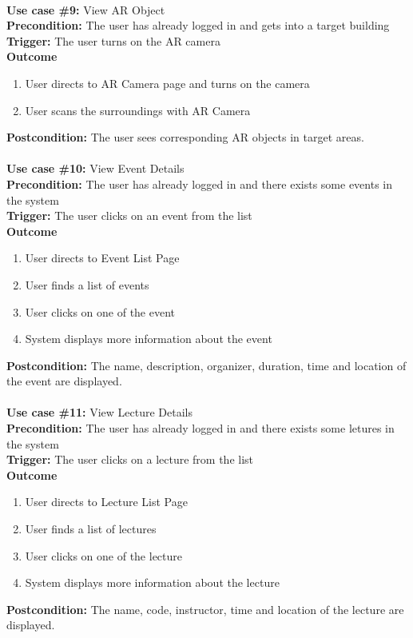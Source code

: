 \documentclass[12pt]{article}
\begin{document}
\noindent\\
\textbf{Use case \#9:} View AR Object\\
\textbf{Precondition:} The user has already logged in and gets into a target building\\
\textbf{Trigger:} The user turns on the AR camera\\
\textbf{Outcome}
\begin{enumerate}
	\item User directs to AR Camera page and turns on the camera
    \item User scans the surroundings with AR Camera
\end{enumerate}
\textbf{Postcondition:} The user sees corresponding AR objects in target areas.\\


\noindent\\
\textbf{Use case \#10:} View Event Details\\
\textbf{Precondition:} The user has already logged in and there exists some events in the system\\
\textbf{Trigger:} The user clicks on an event from the list\\
\textbf{Outcome}
\begin{enumerate}
	\item User directs to Event List Page
    \item User finds a list of events
    \item User clicks on one of the event
    \item System displays more information about the event
\end{enumerate}
\textbf{Postcondition:} The name, description,  organizer, duration, time and location of the event are displayed.\\


\noindent\\
\textbf{Use case \#11:} View Lecture Details\\
\textbf{Precondition:} The user has already logged in and there exists some letures in the system\\
\textbf{Trigger:} The user clicks on a lecture from the list\\
\textbf{Outcome}
\begin{enumerate}
	\item User directs to Lecture List Page
    \item User finds a list of lectures
    \item User clicks on one of the lecture
    \item System displays more information about the lecture
\end{enumerate}
\textbf{Postcondition:} The name, code,  instructor, time and location of the lecture are displayed.\\
\end{document}
